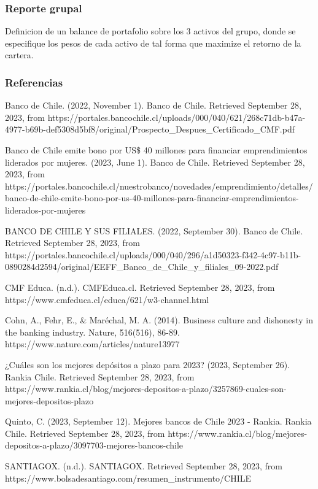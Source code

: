 \documentclass[
  letterpaper,
  DIV=11,
  numbers=noendperiod]{scrartcl}
\begin{document}
\hypertarget{reporte-grupal}{%
\subsubsection{Reporte grupal}\label{reporte-grupal}}

Definicion de un balance de portafolio sobre los 3 activos del grupo,
donde se especifique los pesos de cada activo de tal forma que maximize
el retorno de la cartera.

\hypertarget{referencias}{%
\subsubsection{Referencias}\label{referencias}}

Banco de Chile. (2022, November 1). Banco de Chile. Retrieved September
28, 2023, from
https://portales.bancochile.cl/uploads/000/040/621/268c71db-b47a-4977-b69b-def5308d5bf8/original/Prospecto\_Despues\_Certificado\_CMF.pdf

Banco de Chile emite bono por US\$ 40 millones para financiar
emprendimientos liderados por mujeres. (2023, June 1). Banco de Chile.
Retrieved September 28, 2023, from
https://portales.bancochile.cl/nuestrobanco/novedades/emprendimiento/detalles/banco-de-chile-emite-bono-por-us-40-millones-para-financiar-emprendimientos-liderados-por-mujeres

BANCO DE CHILE Y SUS FILIALES. (2022, September 30). Banco de Chile.
Retrieved September 28, 2023, from
https://portales.bancochile.cl/uploads/000/040/296/a1d50323-f342-4c97-b11b-0890284d2594/original/EEFF\_Banco\_de\_Chile\_y\_filiales\_09-2022.pdf

CMF Educa. (n.d.). CMFEduca.cl. Retrieved September 28, 2023, from
https://www.cmfeduca.cl/educa/621/w3-channel.html

Cohn, A., Fehr, E., \& Maréchal, M. A. (2014). Business culture and
dishonesty in the banking industry. Nature, 516(516), 86-89.
https://www.nature.com/articles/nature13977

¿Cuáles son los mejores depósitos a plazo para 2023? (2023, September
26). Rankia Chile. Retrieved September 28, 2023, from
https://www.rankia.cl/blog/mejores-depositos-a-plazo/3257869-cuales-son-mejores-depositos-plazo

Quinto, C. (2023, September 12). Mejores bancos de Chile 2023 - Rankia.
Rankia Chile. Retrieved September 28, 2023, from
https://www.rankia.cl/blog/mejores-depositos-a-plazo/3097703-mejores-bancos-chile

SANTIAGOX. (n.d.). SANTIAGOX. Retrieved September 28, 2023, from
https://www.bolsadesantiago.com/resumen\_instrumento/CHILE
\end{document}
